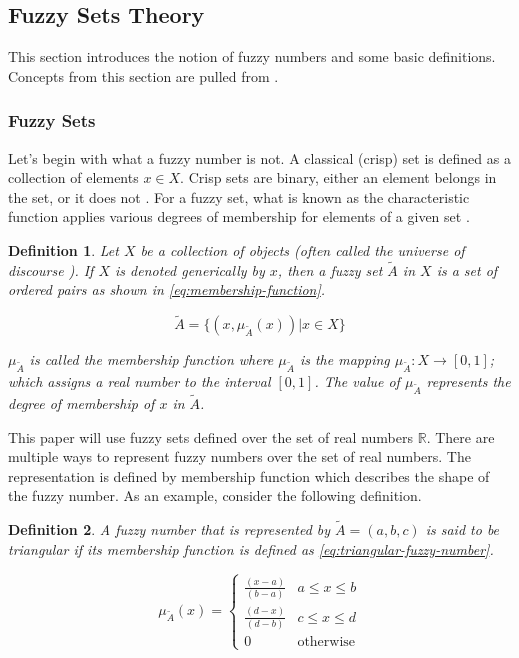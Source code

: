 \documentclass[11pt,a4paper,final]{article}
\newtheorem{definition}{Definition}[section]
\begin{document}
\subsection{Fuzzy Sets Theory}
\label{sec:orgee5d16d}
This section introduces the notion of fuzzy numbers and some basic definitions. Concepts from this section are pulled
from \cite{zimmermann-2001-fuzzy-set,das-2016-mathem-model,yaghobi-2014-compar-fuzzy,bello-2019-fuzzy-activ}.

\subsubsection{Fuzzy Sets}
\label{sec:org325f5ef}
Let's begin with what a fuzzy number is not. A classical (crisp) set is defined as a collection of elements \(x \in X\).
Crisp sets are binary, either an element belongs in the set, or it does not \cite{zimmermann-2001-fuzzy-set}. For a
fuzzy set, what is known as the characteristic function applies various degrees of membership for elements of a given
set \cite{zimmermann-2001-fuzzy-set}.

\begin{definition}
Let \(X\) be a collection of objects (often called the universe of discourse \cite{bello-2019-fuzzy-activ}). If \(X\) is denoted
generically by \(x\), then a fuzzy set \(\tilde{A}\) in \(X\) is a set of ordered pairs as shown in \ref{eq:membership-function}.

\begin{equation}
\label{eq:membership-function}
\tilde{A} = \{(x, \mu_{\tilde{A}}(x))| x\in X\}
\end{equation}

\noindent
\(\mu_{\tilde{A}}\) is called the membership function where \(\mu_{\tilde{A}}\) is the mapping \(\mu_{\tilde{A}} : X \rightarrow
[0,1]\); which assigns a real number to the interval \([0,1]\). The value of \(\mu_{\tilde{A}}\) represents the degree of
membership of \(x\) in \(\tilde{A}\).
\end{definition}

This paper will use fuzzy sets defined over the set of real numbers \(\mathbb{R}\). There are multiple ways to represent fuzzy
numbers over the set of real numbers. The representation is defined by membership function which describes the shape of
the fuzzy number. As an example, consider the following definition.

\begin{definition}
A fuzzy number that is represented by \(\tilde{A} = (a,b,c)\) is said to be triangular if its membership function is
defined as \ref{eq:triangular-fuzzy-number}.

\begin{equation}
\label{eq:triangular-fuzzy-number}
  \mu_{\tilde{A}}(x) =
  \begin{cases}
    \frac{(x-a)}{(b-a)} & a \le x \le b \\
    \frac{(d-x)}{(d-b)} & c \le x \le d \\
    0                   & \text{otherwise}
  \end{cases}
\end{equation}
\end{definition}
\end{document}
